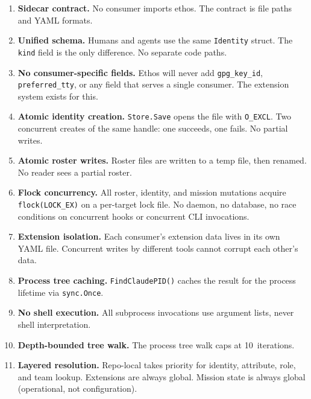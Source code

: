 \documentclass[a4paper,10pt]{article}
\newcommand{\field}[1]{\texttt{#1}}
\begin{document}
\begin{enumerate}
  \item \textbf{Sidecar contract.}  No consumer imports ethos.
    The contract is file paths and YAML formats.

  \item \textbf{Unified schema.}  Humans and agents use the same
    \texttt{Identity} struct.  The \field{kind} field is the only
    difference.  No separate code paths.

  \item \textbf{No consumer-specific fields.}  Ethos will never add
    \field{gpg\_key\_id}, \field{preferred\_tty}, or any field that
    serves a single consumer.  The extension system exists for this.

  \item \textbf{Atomic identity creation.}  \texttt{Store.Save}
    opens the file with \texttt{O\_EXCL}.  Two concurrent creates
    of the same handle: one succeeds, one fails.  No partial writes.

  \item \textbf{Atomic roster writes.}  Roster files are written to
    a temp file, then renamed.  No reader sees a partial roster.

  \item \textbf{Flock concurrency.}  All roster, identity, and
    mission mutations acquire \texttt{flock(LOCK\_EX)} on a
    per-target lock file.  No daemon, no database, no race
    conditions on concurrent hooks or concurrent CLI invocations.

  \item \textbf{Extension isolation.}  Each consumer's extension
    data lives in its own YAML file.  Concurrent writes by different
    tools cannot corrupt each other's data.

  \item \textbf{Process tree caching.}  \texttt{FindClaudePID()}
    caches the result for the process lifetime via
    \texttt{sync.Once}.

  \item \textbf{No shell execution.}  All subprocess invocations use
    argument lists, never shell interpretation.

  \item \textbf{Depth-bounded tree walk.}  The process tree walk
    caps at 10~iterations.

  \item \textbf{Layered resolution.}  Repo-local takes priority for
    identity, attribute, role, and team lookup.  Extensions are
    always global.  Mission state is always global (operational,
    not configuration).


\end{enumerate}
\end{document}
